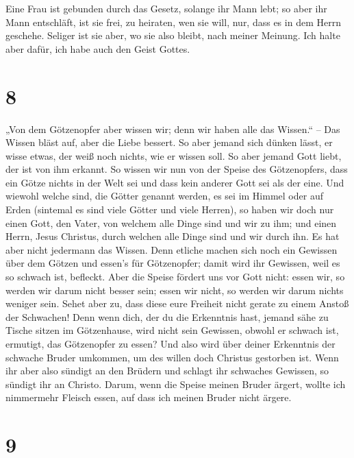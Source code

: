  Eine Frau ist gebunden durch das Gesetz, solange ihr
Mann lebt; so aber ihr Mann entschläft, ist sie frei, zu heiraten, wen
sie will, nur, dass es in dem Herrn geschehe.  Seliger
ist sie aber, wo sie also bleibt, nach meiner Meinung. Ich halte aber
dafür, ich habe auch den Geist Gottes.

\hypertarget{section-7}{%
\section{8}\label{section-7}}

 „Von dem Götzenopfer aber wissen wir; denn wir haben alle
das Wissen.`` -- Das Wissen bläst auf, aber die Liebe bessert.
 So aber jemand sich dünken lässt, er wisse etwas, der
weiß noch nichts, wie er wissen soll.  So aber jemand Gott
liebt, der ist von ihm erkannt.  So wissen wir nun von der
Speise des Götzenopfers, dass ein Götze nichts in der Welt sei und dass
kein anderer Gott sei als der eine.  Und wiewohl welche
sind, die Götter genannt werden, es sei im Himmel oder auf Erden
(sintemal es sind viele Götter und viele Herren),  so
haben wir doch nur einen Gott, den Vater, von welchem alle Dinge sind
und wir zu ihm; und einen Herrn, Jesus Christus, durch welchen alle
Dinge sind und wir durch ihn.  Es hat aber nicht jedermann
das Wissen. Denn etliche machen sich noch ein Gewissen über dem Götzen
und essen's für Götzenopfer; damit wird ihr Gewissen, weil es so schwach
ist, befleckt.  Aber die Speise fördert uns vor Gott
nicht: essen wir, so werden wir darum nicht besser sein; essen wir
nicht, so werden wir darum nichts weniger sein.  Sehet
aber zu, dass diese eure Freiheit nicht gerate zu einem Anstoß der
Schwachen!  Denn wenn dich, der du die Erkenntnis hast,
jemand sähe zu Tische sitzen im Götzenhause, wird nicht sein Gewissen,
obwohl er schwach ist, ermutigt, das Götzenopfer zu essen?
 Und also wird über deiner Erkenntnis der schwache Bruder
umkommen, um des willen doch Christus gestorben ist. 
Wenn ihr aber also sündigt an den Brüdern und schlagt ihr schwaches
Gewissen, so sündigt ihr an Christo.  Darum, wenn die
Speise meinen Bruder ärgert, wollte ich nimmermehr Fleisch essen, auf
dass ich meinen Bruder nicht ärgere.

\hypertarget{section-8}{%
\section{9}\label{section-8}}

